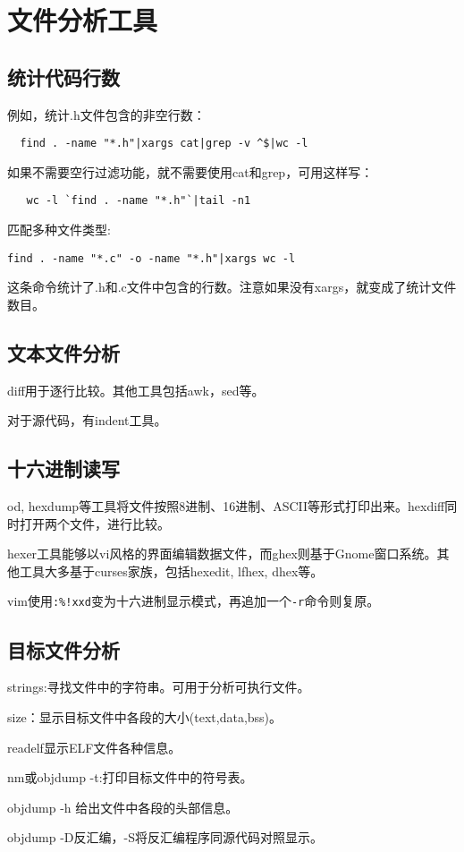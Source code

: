 
\section{文件分析工具}

\subsection{统计代码行数}
例如，统计.h文件包含的非空行数：
\begin{verbatim}
  find . -name "*.h"|xargs cat|grep -v ^$|wc -l 
\end{verbatim}
如果不需要空行过滤功能，就不需要使用cat和grep，可用这样写：
\begin{verbatim}
   wc -l `find . -name "*.h"`|tail -n1
\end{verbatim}
匹配多种文件类型:
\begin{verbatim}
find . -name "*.c" -o -name "*.h"|xargs wc -l
\end{verbatim}
这条命令统计了.h和.c文件中包含的行数。注意如果没有xargs，就变成了统计文件数目。

\subsection{文本文件分析}
diff用于逐行比较。其他工具包括awk，sed等。

对于源代码，有indent工具。


\subsection{十六进制读写}

od, hexdump等工具将文件按照8进制、16进制、ASCII等形式打印出来。hexdiff同时打开两个文件，进行比较。

hexer工具能够以vi风格的界面编辑数据文件，而ghex则基于Gnome窗口系统。其他工具大多基于curses家族，包括hexedit, lfhex, dhex等。

vim使用\verb$:%!xxd$变为十六进制显示模式，再追加一个\verb$-r$命令则复原。

\subsection{目标文件分析}

strings:寻找文件中的字符串。可用于分析可执行文件。

size：显示目标文件中各段的大小(text,data,bss)。

readelf显示ELF文件各种信息。

nm或objdump -t:打印目标文件中的符号表。

objdump -h 给出文件中各段的头部信息。

objdump -D反汇编，-S将反汇编程序同源代码对照显示。









